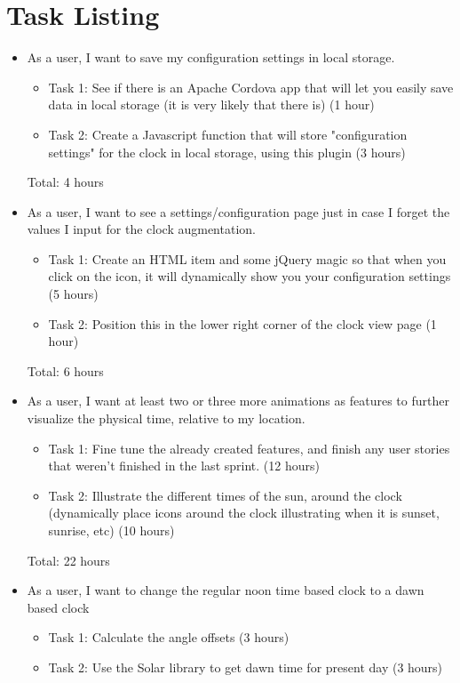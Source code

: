 \documentclass[11pt]{article}
\begin{document}
	\section{Task Listing}
		\vspace{-3mm}
		\begin{itemize}
			\item As a user, I want to save my configuration settings in local storage.
			\begin{itemize}
			    \item Task 1: See if there is an Apache Cordova app that will let you easily save data in local storage (it is very likely that there is) (1 hour)
			    \item Task 2: Create a Javascript function that will store "configuration settings" for the clock in local storage, using this plugin (3 hours)
			\end{itemize}
			Total: 4 hours
			\item As a user, I want to see a settings/configuration page just in case I forget the values I input for the clock augmentation.
			\begin{itemize}
			    \item Task 1: Create an HTML item and some jQuery magic so that when you click on the icon, it will dynamically show you your configuration settings (5 hours)
			    \item Task 2: Position this in the lower right corner of the clock view page (1 hour)
			\end{itemize}
			Total: 6 hours
			\item As a user, I want at least two or three more animations as features to further visualize the physical time, relative to my location.
			\begin{itemize}
			    \item Task 1: Fine tune the already created features, and finish any user stories that weren't finished in the last sprint. (12 hours)
			    \item Task 2: Illustrate the different times of the sun, around the clock (dynamically place icons around the clock illustrating when it is sunset, sunrise, etc) (10 hours)
			\end{itemize}
			 Total: 22 hours
			\item As a user, I want to change the regular noon time based clock to a dawn based clock
			\begin{itemize}
				\item Task 1: Calculate the angle offsets (3 hours)
				\item Task 2: Use the Solar library to get dawn time for present day (3 hours)
			\end{itemize}
		\end{itemize}
\end{document}
